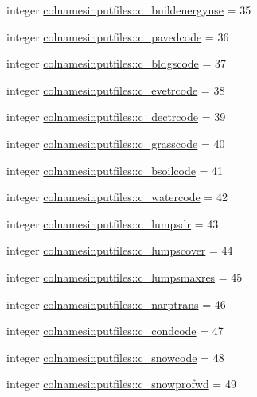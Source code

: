 \begin{DoxyCompactItemize}
integer \hyperlink{namespacecolnamesinputfiles_a811f7d78ee35342f1708073383f4da17}{colnamesinputfiles\+::c\+\_\+buildenergyuse} = 35
\item 
integer \hyperlink{namespacecolnamesinputfiles_aa6cbac2a118fa736e41076c46c1e9a78}{colnamesinputfiles\+::c\+\_\+pavedcode} = 36
\item 
integer \hyperlink{namespacecolnamesinputfiles_a0155665a9c028c6e9ed4d42703f96b7e}{colnamesinputfiles\+::c\+\_\+bldgscode} = 37
\item 
integer \hyperlink{namespacecolnamesinputfiles_ab5729e8368a3611c6361ecd0a74b0e27}{colnamesinputfiles\+::c\+\_\+evetrcode} = 38
\item 
integer \hyperlink{namespacecolnamesinputfiles_a2ad32fd4b205fb9b641e07196a382951}{colnamesinputfiles\+::c\+\_\+dectrcode} = 39
\item 
integer \hyperlink{namespacecolnamesinputfiles_a4be2d6d7d3ca63a7e9edbd87dbc5cb6a}{colnamesinputfiles\+::c\+\_\+grasscode} = 40
\item 
integer \hyperlink{namespacecolnamesinputfiles_ab3c7d949c11126cfbb605bb3fbeeffea}{colnamesinputfiles\+::c\+\_\+bsoilcode} = 41
\item 
integer \hyperlink{namespacecolnamesinputfiles_a38ff6513e7e6bb0b350213936967f86a}{colnamesinputfiles\+::c\+\_\+watercode} = 42
\item 
integer \hyperlink{namespacecolnamesinputfiles_a93d199d7ce0bbedc87456becfe2dd3c4}{colnamesinputfiles\+::c\+\_\+lumpsdr} = 43
\item 
integer \hyperlink{namespacecolnamesinputfiles_a639190b378d3266fe7f888278247d979}{colnamesinputfiles\+::c\+\_\+lumpscover} = 44
\item 
integer \hyperlink{namespacecolnamesinputfiles_ad466968b4cdd794a5eb6b62e072bcbdb}{colnamesinputfiles\+::c\+\_\+lumpsmaxres} = 45
\item 
integer \hyperlink{namespacecolnamesinputfiles_a2f7a919691e19ab3b4530964bb7d59ba}{colnamesinputfiles\+::c\+\_\+narptrans} = 46
\item 
integer \hyperlink{namespacecolnamesinputfiles_aeade668094b48396c577d712f18cddef}{colnamesinputfiles\+::c\+\_\+condcode} = 47
\item 
integer \hyperlink{namespacecolnamesinputfiles_abf3957da7f8fa068b2bff815f8e9b7aa}{colnamesinputfiles\+::c\+\_\+snowcode} = 48
\item 
integer \hyperlink{namespacecolnamesinputfiles_aecda68bffb8b94e304d69078f616d05a}{colnamesinputfiles\+::c\+\_\+snowprofwd} = 49
\item 

\end{DoxyCompactItemize}
